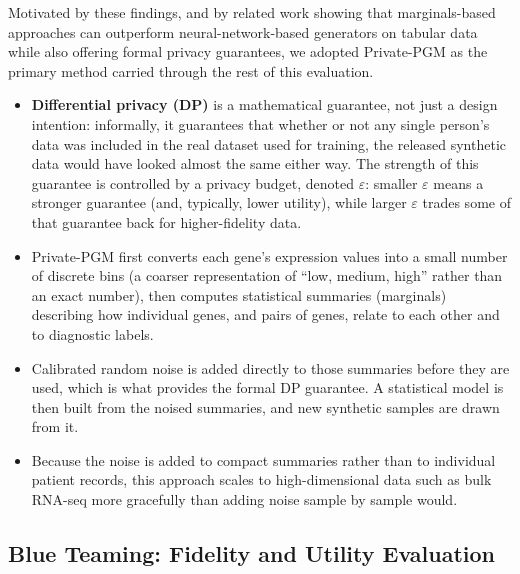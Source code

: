 Motivated by these findings, and by related work showing that marginals-based approaches can outperform neural-network-based generators on tabular data while also offering formal privacy guarantees, we adopted Private-PGM \citep{mckenna2019graphical} as the primary method carried through the rest of this evaluation.

\begin{technicalbox}[title={How Private-PGM works, and what ``differential privacy'' means}]
  \begin{itemize}
    \item \textbf{Differential privacy (DP)} is a mathematical guarantee,
          not just a design intention: informally, it guarantees that
          whether or not any single person's data was included in the
          real dataset used for training, the released synthetic data
          would have looked almost the same either way. The strength of
          this guarantee is controlled by a privacy budget, denoted
          $\varepsilon$: smaller $\varepsilon$ means a stronger guarantee
          (and, typically, lower utility), while larger $\varepsilon$
          trades some of that guarantee back for higher-fidelity data.
    \item Private-PGM first converts each gene's expression values into a
          small number of discrete bins (a coarser representation of
          ``low, medium, high'' rather than an exact number), then
          computes statistical summaries (marginals) describing how
          individual genes, and pairs of genes, relate to each other and
          to diagnostic labels.
    \item Calibrated random noise is added directly to those summaries
          before they are used, which is what provides the formal DP
          guarantee. A statistical model is then built from the
          noised summaries, and new synthetic samples are drawn from it.
    \item Because the noise is added to compact summaries rather than to
          individual patient records, this approach scales to
          high-dimensional data such as bulk RNA-seq more gracefully than
          adding noise sample by sample would.
  \end{itemize}
\end{technicalbox}

\subsection{Blue Teaming: Fidelity and Utility Evaluation}

